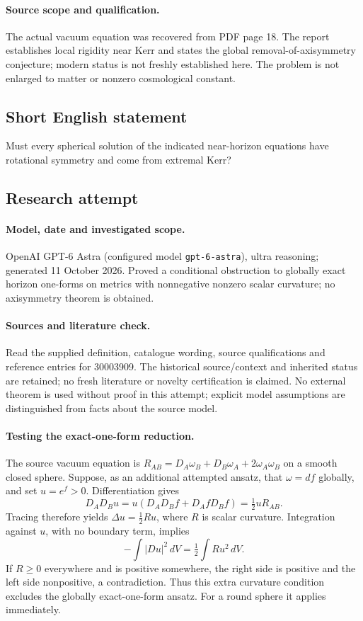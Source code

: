 \documentclass[11pt]{article}
\begin{document}
\paragraph{Source scope and qualification.}
The actual vacuum equation was recovered from PDF page 18. The report establishes local rigidity near Kerr and states the global removal-of-axisymmetry conjecture; modern status is not freshly established here. The problem is not enlarged to matter or nonzero cosmological constant.
\subsection{Short English statement}
Must every spherical solution of the indicated near-horizon equations have rotational symmetry and come from extremal Kerr?
\subsection{Research attempt}
\paragraph{Model, date and investigated scope.}
OpenAI GPT-6 Astra (configured model \texttt{gpt-6-astra}), ultra reasoning; generated 11 October 2026. Proved a conditional obstruction to globally exact horizon one-forms on metrics with nonnegative nonzero scalar curvature; no axisymmetry theorem is obtained.

\paragraph{Sources and literature check.}
Read the supplied definition, catalogue wording, source qualifications and reference entries for 30003909. The historical source/context and inherited status are retained; no fresh literature or novelty certification is claimed. No external theorem is used without proof in this attempt; explicit model assumptions are distinguished from facts about the source model.

\paragraph{Testing the exact-one-form reduction.} The source vacuum equation is \(R_{AB}=D_A\omega_B+D_B\omega_A+2\omega_A\omega_B\) on a smooth closed sphere. Suppose, as an additional attempted ansatz, that \(\omega=df\) globally, and set \(u=e^f>0\). Differentiation gives
\[
 D_AD_Bu=u(D_AD_Bf+D_AfD_Bf)=\tfrac12uR_{AB}.
\]
Tracing therefore yields \(\Delta u=\tfrac12Ru\), where \(R\) is scalar curvature. Integration against \(u\), with no boundary term, implies
\[
 -\int|Du|^2\,dV=\tfrac12\int R u^2\,dV.
\]
If \(R\ge0\) everywhere and is positive somewhere, the right side is positive and the left side nonpositive, a contradiction. Thus this extra curvature condition excludes the globally exact-one-form ansatz. For a round sphere it applies immediately.
\end{document}
